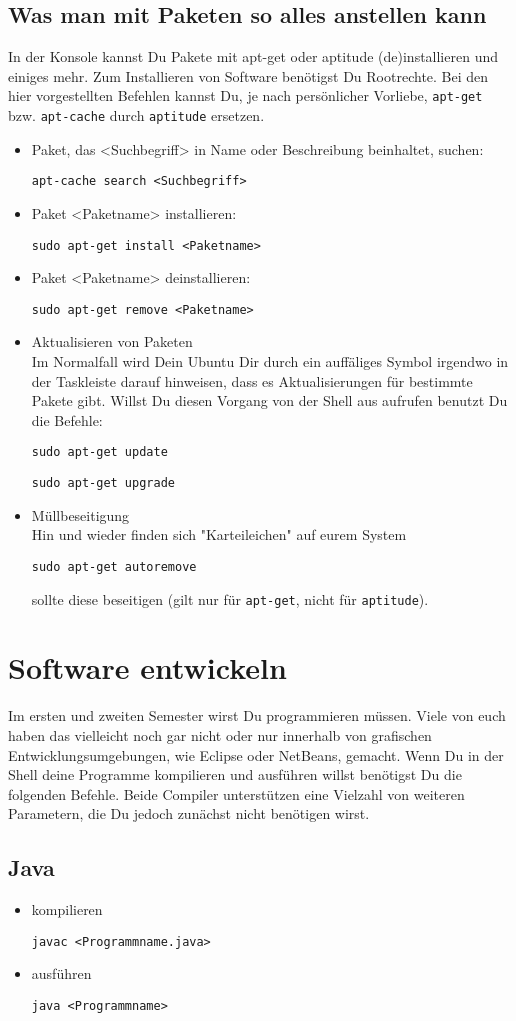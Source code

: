 \documentclass[a4paper,10pt]{article}
\newcommand{\befehl}[1]{
  \begin{center}
    \texttt{#1}
  \end{center}
}
\begin{document}
    \subsection{Was man mit Paketen so alles anstellen kann}
      In der Konsole kannst Du Pakete mit apt-get oder aptitude (de)installieren und einiges mehr. Zum Installieren von Software benötigst Du Rootrechte. Bei den hier vorgestellten Befehlen kannst Du, je nach persönlicher Vorliebe,  \texttt{apt-get} bzw. \texttt{apt-cache} durch \texttt{aptitude} ersetzen.
      \begin{itemize}
	\item Paket, das <Suchbegriff> in Name oder Beschreibung beinhaltet, suchen: 
	  \befehl{apt-cache search <Suchbegriff>}
	\item Paket <Paketname> installieren:
	  \befehl{sudo apt-get install <Paketname>}
	\item Paket <Paketname> deinstallieren:
	  \befehl{sudo apt-get remove <Paketname>}
	\item Aktualisieren von Paketen \\
	  Im Normalfall wird Dein Ubuntu Dir durch ein auffäliges Symbol irgendwo in der Taskleiste darauf hinweisen, dass es Aktualisierungen für bestimmte Pakete gibt. Willst Du diesen Vorgang von der Shell aus aufrufen benutzt Du die Befehle:
	  \befehl{sudo apt-get update}
	  \befehl{sudo apt-get upgrade}
	\item Müllbeseitigung \\
	  Hin und wieder finden sich "Karteileichen" auf eurem System
	  \befehl{sudo apt-get autoremove}
	  sollte diese beseitigen (gilt nur für \texttt{apt-get}, nicht für \texttt{aptitude}).
      \end{itemize}

  \section{Software entwickeln}
    Im ersten und zweiten Semester wirst Du programmieren müssen. Viele von euch haben das vielleicht noch gar nicht oder nur innerhalb von grafischen Entwicklungsumgebungen, wie Eclipse oder NetBeans, gemacht. Wenn Du in der Shell deine Programme kompilieren und ausführen willst benötigst Du die folgenden Befehle. Beide Compiler unterstützen eine Vielzahl von weiteren Parametern, die Du jedoch zunächst nicht benötigen wirst.
    \subsection{Java}
      \begin{itemize}
	\item kompilieren 
	  \befehl{javac <Programmname.java>}
	\item ausführen
	  \befehl{java <Programmname>}
      \end{itemize}
\end{document}
